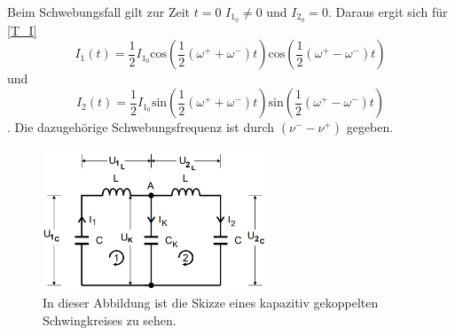Beim Schwebungsfall gilt zur Zeit $t = 0$ $I_{1_0}\neq 0$ und $I_{2_0} = 0$. Daraus ergit sich für \autoref{T_I} 
\begin{equation*}
    I_1(t) = \frac{1}{2} I_{1_0}\text{cos}\left(\frac{1}{2}(\omega^+ + \omega^-)t\right) \text{cos}\left(\frac{1}{2}(\omega^+ - \omega^-)t\right)
\end{equation*}
und
\begin{equation*}
    I_2(t) = \frac{1}{2} I_{1_0}\text{sin}\left(\frac{1}{2}(\omega^+ + \omega^-)t\right) \text{sin}\left(\frac{1}{2}(\omega^+ - \omega^-)t\right)
\end{equation*}
.
Die dazugehörige Schwebungsfrequenz ist durch $\left(\nu^- -\nu^+\right)$ gegeben.
\begin{figure}
    \centering
    \caption{In dieser Abbildung ist die Skizze eines kapazitiv gekoppelten Schwingkreises zu sehen. \cite{v355}}
    \label{fig:T_skgS}
    \includegraphics[width = 0.6\textwidth]{content/SkizzegekoppelterSchwingkreis.PNG}
\end{figure}

